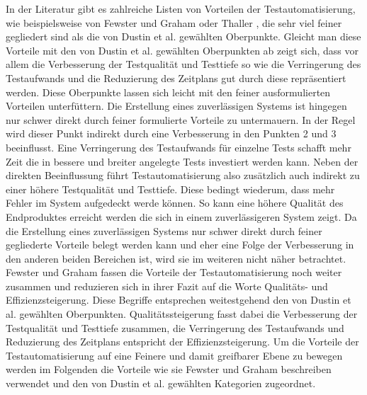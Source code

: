 In der Literatur gibt es zahlreiche Listen von Vorteilen der Testautomatisierung, wie beispielsweise von Fewster und Graham \cite[vgl. S.9 ff.]{fewster_software_1999} oder Thaller \cite[vgl. S.28 ff.]{thaller_software-test_2002}, die sehr viel feiner gegliedert sind als die von Dustin et al. \cite[S.44 ff.]{dustin_software_2001} gewählten Oberpunkte. 
Gleicht man diese Vorteile mit den von Dustin et al. gewählten Oberpunkten ab zeigt sich, dass vor allem die Verbesserung der Testqualität und Testtiefe so wie die Verringerung des Testaufwands und die Reduzierung des Zeitplans gut durch diese repräsentiert werden. Diese Oberpunkte lassen sich leicht mit den feiner ausformulierten Vorteilen unterfüttern. Die Erstellung eines zuverlässigen Systems ist hingegen nur schwer direkt durch feiner formulierte Vorteile zu untermauern. In der Regel wird dieser Punkt indirekt durch eine Verbesserung in den Punkten 2 und 3 beeinflusst.
Eine Verringerung des Testaufwands für einzelne Tests schafft mehr Zeit die in bessere und breiter angelegte Tests investiert werden kann. Neben der direkten Beeinflussung führt Testautomatisierung also zusätzlich auch indirekt zu einer höhere Testqualität und Testtiefe. Diese bedingt wiederum, dass mehr Fehler im System aufgedeckt werde können. So kann eine höhere Qualität des Endproduktes erreicht werden die sich in einem zuverlässigeren System zeigt.
Da die Erstellung eines zuverlässigen Systems nur schwer direkt durch feiner gegliederte Vorteile belegt werden kann und eher eine Folge der Verbesserung in den anderen beiden Bereichen ist, wird sie im weiteren nicht näher betrachtet.\\
Fewster und Graham \cite[vgl. S.10]{fewster_software_1999} fassen die Vorteile der Testautomatisierung noch weiter zusammen und reduzieren sich in ihrer Fazit auf die Worte Qualitäts- und Effizienzsteigerung.
Diese Begriffe entsprechen weitestgehend den von Dustin et al. gewählten Oberpunkten. Qualitätssteigerung fasst dabei die Verbesserung der Testqualität und Testtiefe zusammen, die Verringerung des Testaufwands und Reduzierung des Zeitplans entspricht der Effizienzsteigerung. 
Um die Vorteile der Testautomatisierung auf eine Feinere und damit greifbarer Ebene zu bewegen werden im Folgenden die Vorteile wie sie 
Fewster und Graham beschreiben verwendet und den von Dustin et al. gewählten Kategorien zugeordnet.

